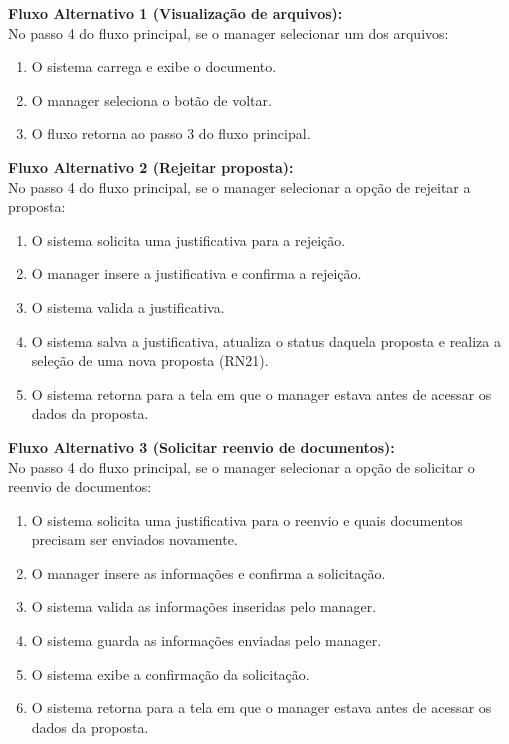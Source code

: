 \noindent\textbf{Fluxo Alternativo 1 (Visualização de arquivos):}\\
No passo 4 do fluxo principal, se o manager selecionar um dos arquivos:
\begin{enumerate}[noitemsep, topsep=-5pt, parsep=0pt]
    \item O sistema carrega e exibe o documento.
    \item O manager seleciona o botão de voltar.
    \item O fluxo retorna ao passo 3 do fluxo principal.
\end{enumerate}

\noindent\textbf{Fluxo Alternativo 2 (Rejeitar proposta):}\\
No passo 4 do fluxo principal, se o manager selecionar a opção de rejeitar a proposta:
\begin{enumerate}[noitemsep, topsep=-5pt, parsep=0pt]
    \item O sistema solicita uma justificativa para a rejeição.
    \item O manager insere a justificativa e confirma a rejeição.
    \item O sistema valida a justificativa.
    \item O sistema salva a justificativa, atualiza o status daquela proposta e realiza a seleção de uma nova proposta (RN21).
    \item O sistema retorna para a tela em que o manager estava antes de acessar os dados da proposta.
\end{enumerate}

\noindent\textbf{Fluxo Alternativo 3 (Solicitar reenvio de documentos):}\\
No passo 4 do fluxo principal, se o manager selecionar a opção de solicitar o reenvio de documentos:
\begin{enumerate}[noitemsep, topsep=-5pt, parsep=0pt]
    \item O sistema solicita uma justificativa para o reenvio e quais documentos precisam ser enviados novamente.
    \item O manager insere as informações e confirma a solicitação.
    \item O sistema valida as informações inseridas pelo manager.
    \item O sistema guarda as informações enviadas pelo manager.
    \item O sistema exibe a confirmação da solicitação.
    \item O sistema retorna para a tela em que o manager estava antes de acessar os dados da proposta.
\end{enumerate}


